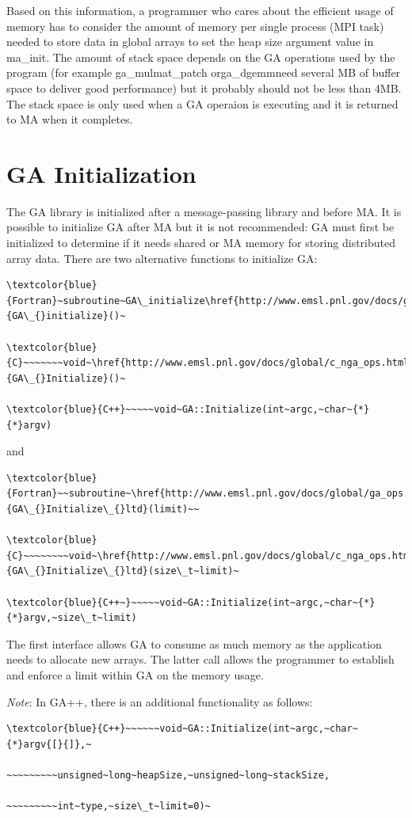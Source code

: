 Based on this information, a programmer who cares about the efficient
usage of memory has to consider the amount of memory per single process
(MPI task) needed to store data in global arrays to set the heap size
argument value in ma\_init. The amount of stack space depends on the
GA operations used by the program (for example ga\_mulmat\_patch orga\_dgemmneed
several MB of buffer space to deliver good performance) but it probably
should not be less than 4MB. The stack space is only used when a GA
operaion is executing and it is returned to MA when it completes. 


\section{GA Initialization }

The GA library is initialized after a message-passing library and
before MA. It is possible to initialize GA after MA but it is not
recommended: GA must first be initialized to determine if it needs
shared or MA memory for storing distributed array data. There are
two alternative functions to initialize GA:
\begin{verbatim}
\textcolor{blue}{Fortran}~subroutine~GA\_initialize\href{http://www.emsl.pnl.gov/docs/global/ga_ops.html\#ga_initialize}{GA\_{}initialize}()~

\textcolor{blue}{C}~~~~~~~void~\href{http://www.emsl.pnl.gov/docs/global/c_nga_ops.html\#ga_initialize}{GA\_{}Initialize}()~

\textcolor{blue}{C++}~~~~~void~GA::Initialize(int~argc,~char~{*}{*}argv)
\end{verbatim}
and
\begin{verbatim}
\textcolor{blue}{Fortran}~~subroutine~\href{http://www.emsl.pnl.gov/docs/global/ga_ops.html\#ga_initialize_ltd}{GA\_{}Initialize\_{}ltd}(limit)~~

\textcolor{blue}{C}~~~~~~~~void~\href{http://www.emsl.pnl.gov/docs/global/c_nga_ops.html\#ga_initialize_ltd}{GA\_{}Initialize\_{}ltd}(size\_t~limit)~

\textcolor{blue}{C++~}~~~~~void~GA::Initialize(int~argc,~char~{*}{*}argv,~size\_t~limit)
\end{verbatim}
The first interface allows GA to consume as much memory as the application
needs to allocate new arrays. The latter call allows the programmer
to establish and enforce a limit within GA on the memory usage.

\emph{Note}: In GA++, there is an additional functionality as follows: 
\begin{verbatim}
\textcolor{blue}{C++}~~~~~~void~GA::Initialize(int~argc,~char~{*}argv{[}{]},~

~~~~~~~~~unsigned~long~heapSize,~unsigned~long~stackSize,

~~~~~~~~~int~type,~size\_t~limit=0)~
\end{verbatim}

